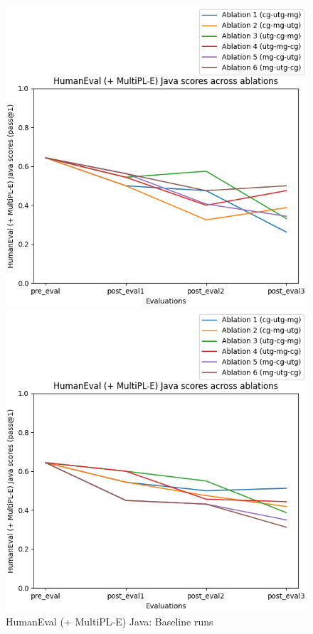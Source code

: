 \begin{figure}[H]
    \centering
    \begin{minipage}{0.45\textwidth}
        \centering
        \includegraphics[width=1.1\textwidth]{Figures/results/code_baseline_graphs/human_eval/seed_averaged_humaneval_java_eval_baseline.png}
        \captionsetup{width=1.1\textwidth}
        \caption{HumanEval (+ MultiPL-E) Java: Baseline runs}
        \label{JavaBaselineAblations}
    \end{minipage}\hfill
    \begin{minipage}{0.45\textwidth}
        \centering
        \includegraphics[width=1.1\textwidth]{Figures/results/code_mitigation_graphs/human_eval/seed_averaged_humaneval_java_eval_mitigation.png}

\end{minipage}
\end{figure}
